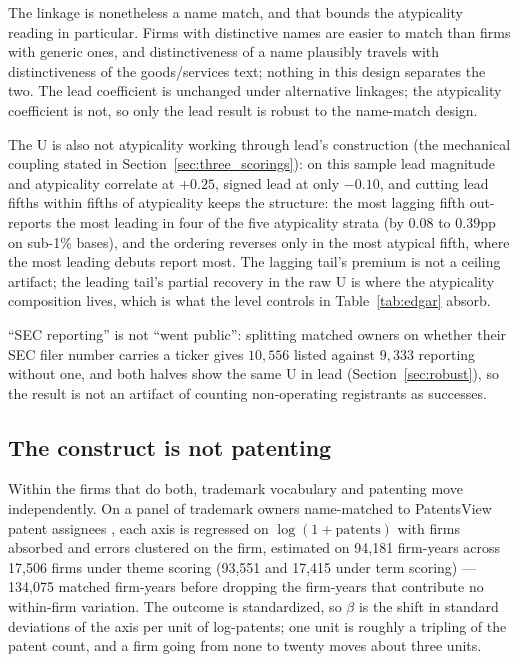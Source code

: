 The linkage is nonetheless a name match, and that bounds the atypicality
reading in particular. Firms with distinctive names are easier to match
than firms with generic ones, and distinctiveness of a name plausibly
travels with distinctiveness of the goods/services text; nothing in this
design separates the two. The lead coefficient is unchanged under
alternative linkages; the atypicality coefficient is not, so only the
lead result is robust to the name-match design.

The U is also not atypicality working through lead's construction (the
mechanical coupling stated in Section~\ref{sec:three_scorings}): on this
sample lead magnitude and atypicality correlate at $+0.25$, signed lead at
only $-0.10$, and cutting lead fifths within fifths of atypicality keeps
the structure: the most lagging fifth out-reports the most leading in four
of the five atypicality strata (by $0.08$ to $0.39$pp on sub-1\% bases),
and the ordering reverses only in the most atypical fifth, where the most
leading debuts report most. The lagging tail's premium is not a ceiling
artifact; the leading tail's partial recovery in the raw U is where the
atypicality composition lives, which is what the level controls in
Table~\ref{tab:edgar} absorb.

``SEC reporting'' is not ``went public'': splitting matched owners on
whether their SEC filer number carries a ticker gives $10{,}556$ listed
against $9{,}333$ reporting without one, and both halves show the same U
in lead (Section~\ref{sec:robust}), so the result is not an artifact of
counting non-operating registrants as successes.

\subsection{The construct is not patenting}\label{sec:patent}

Within the firms that do both, trademark vocabulary and patenting move
independently. On a panel of trademark owners name-matched to PatentsView
patent assignees \citep{PatentsView}, each axis is regressed on
$\log(1 + \mathrm{patents})$ with firms absorbed and errors clustered on
the firm, estimated on 94{,}181 firm-years across 17{,}506 firms under
theme scoring (93{,}551 and 17{,}415 under term scoring) --- 134{,}075
matched firm-years before dropping the firm-years that contribute no
within-firm variation. The outcome is standardized, so $\beta$ is the
shift in standard deviations of the axis per unit of log-patents; one
unit is roughly a tripling of the patent count, and a firm going from
none to twenty moves about three units.

